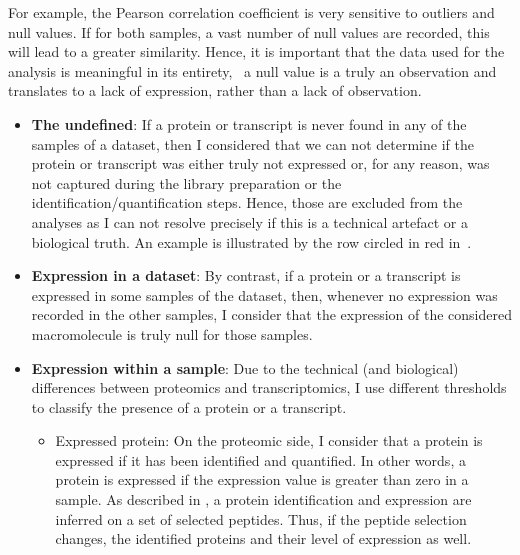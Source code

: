 For example, the Pearson correlation coefficient is very
sensitive to outliers and null values. If for both samples, a vast number of
null values are recorded, this will lead to a greater similarity.
Hence, it is important that the data used for the analysis is meaningful in
its entirety, \ie\ a null value is a truly an observation and translates to
a lack of expression, rather than a lack of observation.\mybr\

\begin{itemize}
        \item\textbf{The undefined}:\label{subsec:ExpressedOrNot-undefined} %
        If a protein or transcript is never found in any of the samples of a dataset,
        then I considered that we can not determine if the protein or transcript was
        either truly not expressed or, for any reason, was not captured during the library
        preparation or the identification/quantification steps. Hence, those are
        excluded from the analyses as I can not resolve precisely if this is a
        technical artefact or a biological truth. An example is illustrated by the row
        circled in red in~.
        \item\textbf{Expression in a dataset}:\label{subsec:ExpressedOrNot--expDataset} %
        By contrast, if a protein or a transcript is expressed in some samples of the
        dataset, then, whenever no expression was recorded in the other
        samples, I consider that the expression of the considered macromolecule is truly
        null for those samples.
        \item\textbf{Expression within a sample}:
        Due to the technical (and biological) differences between proteomics and
        transcriptomics, I use different thresholds to classify the presence of
        a protein or a transcript.
        \begin{itemize}
                \item\textsf{Expressed protein}:
                On the proteomic side, I consider that a protein is expressed
                if it has been identified and quantified.
                In other words, a protein is expressed
                if the expression value is greater than zero in a sample.
                As described in ,
                a protein identification and expression are inferred
                on a set of selected peptides.
                Thus, if the peptide selection changes,
                the identified proteins and their level of expression as well.

\end{itemize}
\end{itemize}
